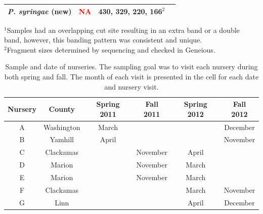 \documentclass[12pt]{article}
\begin{document}
\begin{table}[!ht]
\begin{tabular}{lccc}
\emph{P. syringae} (new)	&	\textcolor{red}{NA}		&	430, 329, 220, 166$^{2}$	& \\
\hline
\end{tabular}
\label{tab:frags}
$^{1}$Samples had an overlapping cut site resulting in an extra band or a double band, however, this banding pattern was consistent and unique.\\
$^{2}$Fragment sizes determined by sequencing and checked in Geneious.
\end{table}


\begin{table}[!ht]
\caption{Sample and date of nurseries.  The sampling goal was to visit each nursery during both spring and fall.  The month of each visit is presented in the cell for each date and nursery visit.}
\begin{tabular}{cccccc}
\hline
\textbf{Nursery} & \textbf{County} & \textbf{Spring 2011} & \textbf{Fall 2011} & \textbf{Spring 2012} & \textbf{Fall 2012} \\
\hline
A & Washington & March & & & December \\
B & Yamhill & April & & & November \\
C & Clackamas & & November & April & \\
D & Marion & & November & March & \\
E & Marion & & November & March & \\
F & Clackamas & & & March & November \\
G & Linn & & & April & December \\
\hline
\end{tabular}
\label{tab:sample}
\end{table}
\end{document}
